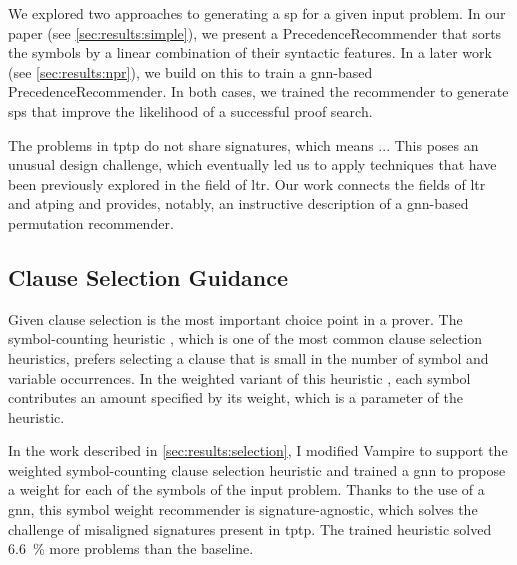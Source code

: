 We explored two approaches to generating a \gls{sp} for a given input problem.
In our paper \cite{} (see \cref{sec:results:simple}), we present a \gls{PrecedenceRecommender} that sorts the symbols by a linear combination of their syntactic features.
In a later work (see \cref{sec:results:npr}), we build on this to train a \acrshort{gnn}-based \gls{PrecedenceRecommender}.
In both cases, we trained the recommender to generate \glspl{sp} that improve the likelihood of a successful proof search.


The problems in \gls{tptp} do not share signatures,
which means ...\todo{}
This poses an unusual design challenge,
which eventually led us to apply techniques that have been previously explored in the field of \gls{ltr}.
Our work connects the fields of \gls{ltr} and \gls{atping} and provides, notably, an instructive description of a \acrshort{gnn}-based permutation recommender.

\subsection{Clause Selection Guidance}
\label{sec:contrib:ClauseSelection}


Given clause selection is the most important choice point in a prover.
The symbol-counting heuristic \cite{DBLP:conf/cade/SchulzM16}, which is one of the most common clause selection heuristics,
prefers selecting a clause that is small in the number of symbol and variable occurrences.
In the weighted variant of this heuristic \cite{E-manual},
each symbol contributes an amount specified by its weight,
which is a parameter of the heuristic.

In the work described in \cref{sec:results:selection},
I modified Vampire to support the weighted symbol-counting clause selection heuristic
and trained a \gls{gnn} to propose a weight for each of the symbols of the input problem.
Thanks to the use of a \gls{gnn}, this symbol weight recommender is signature-agnostic,
which solves the challenge of misaligned signatures present in \gls{tptp}.
The trained heuristic solved \SI{6.6}{\percent} more problems than the baseline.

